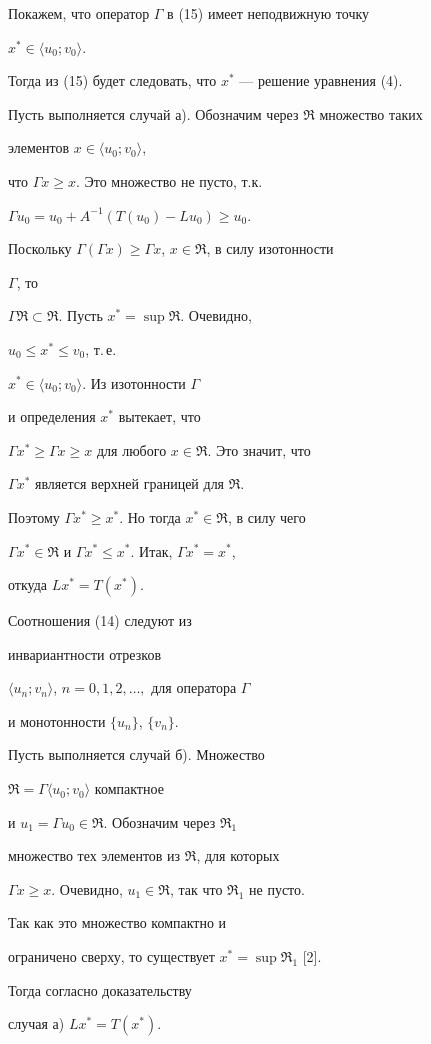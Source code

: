 \begin{pf} Покажем, что оператор $\Gamma$ в (15) имеет неподвижную точку


$x^*\in\langle u_0;v_0\rangle$.


Тогда из (15) будет следовать, что $x^*$ --- решение уравнения (4).





Пусть выполняется случай а). Обозначим через $\Re$ множество таких


элементов $x\in\langle u_0;v_0\rangle$,


что $\Gamma x\ge x$. Это множество не пусто, т.к.


$\Gamma u_0=u_0+A^{-1}(T(u_0)-Lu_0)\ge u_0$.


Поскольку $\Gamma(\Gamma x)\ge\Gamma x$, $x\in\Re$, в силу изотонности


$\Gamma$, то


$\Gamma\Re\subset\Re$. Пусть $x^*=\sup\Re$. Очевидно,


$u_0\le x^*\le v_0$, т.\,е.


$x^*\in\langle u_0;v_0\rangle$. Из изотонности $\Gamma$


и определения $x^*$ вытекает, что


$\Gamma x^*\ge\Gamma x\ge x$ для любого $x\in\Re$. Это значит, что


$\Gamma x^*$ является верхней границей для $\Re$.


Поэтому $\Gamma x^*\ge x^*$. Но тогда $x^*\in\Re$, в силу чего


$\Gamma x^*\in \Re$ и $\Gamma x^*\le x^*$. Итак, $\Gamma x^*=x^*$,


откуда $Lx^*=T(x^*)$.


Соотношения (14) следуют из


инвариантности отрезков


$\langle u_n;v_n\rangle$, $n=0,1,2,\dotsc,$ для оператора $\Gamma$


и монотонности $\{u_n\}$, $\{v_n\}$.





Пусть выполняется случай б). Множество


$\Re=\Gamma\langle u_0;v_0\rangle$ компактное


и $u_1=\Gamma u_0\in\Re$. Обозначим через $\Re_1$


множество тех элементов из $\Re$, для которых


$\Gamma x\ge x$. Очевидно, $u_1\in\Re$, так что $\Re_1$ не пусто.


Так как это множество компактно и


ограничено сверху, то существует $x^*=\sup\Re_1$ [2].


Тогда согласно доказательству


случая а) $Lx^*=T(x^*)$.


\end{pf}





